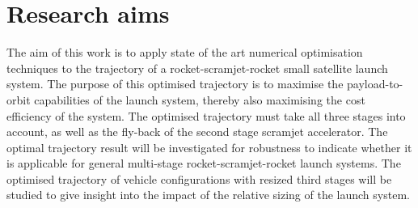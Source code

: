   \section{Research aims}

    The aim of this work is to apply state of the art numerical optimisation techniques to the trajectory of a rocket-scramjet-rocket small satellite launch system. The purpose of this optimised trajectory is to maximise the payload-to-orbit capabilities of the launch system, thereby also maximising the cost efficiency of the system. The optimised trajectory must take all three stages into account, as well as the fly-back of the second stage scramjet accelerator. 
    The optimal trajectory result will be investigated for robustness to indicate whether it is applicable for general multi-stage rocket-scramjet-rocket launch systems. The optimised trajectory of vehicle configurations with resized third stages will be studied to give insight into the impact of the relative sizing of the launch system. 
 
